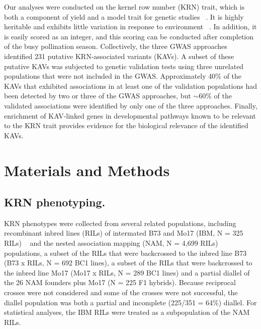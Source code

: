 \documentclass[10pt,letterpaper]{article}
\begin{document}
Our analyses were conducted on the kernel row number (KRN) trait, which is both a component of yield and a model trait for genetic studies ~\cite{hallauer2010quantitative}. It is highly heritable and exhibits little variation in response to environment ~\cite{Lu2011}. In addition, it is easily scored as an integer, and this scoring can be conducted after completion of the busy pollination season. Collectively, the three GWAS approaches identified 231 putative KRN-associated variants (KAVs). A subset of these putative KAVs was subjected to genetic validation tests using three unrelated populations that were not included in the GWAS. Approximately 40\% of the KAVs that exhibited associations in at least one of the validation populations had been detected by two or three of the GWAS approaches, but $\sim$60\% of the validated associations were identified by only one of the three approaches. Finally, enrichment of KAV-linked genes in developmental pathways known to be relevant to the KRN trait provides evidence for the biological relevance of the identified KAVs. 



\section*{Materials and Methods}
\subsection*{KRN phenotyping.}

KRN phenotypes were collected from several related populations, including recombinant inbred lines (RILs) of intermated B73 and Mo17 (IBM, N = 325 RILs) ~\cite{Lee2002} and the nested association mapping (NAM, N = 4,699 RILs) ~\cite{Yu2008} populations, a subset of the RILs that were backcrossed to the inbred line B73 (B73 x RILs, N = 692 BC1 lines), a subset of the RILs that were backcrossed to the inbred line Mo17 (Mo17 x RILs, N = 289 BC1 lines) and a partial diallel of the 26 NAM founders plus Mo17 (N = 225 F1 hybrids). Because reciprocal crosses were not considered and some of the crosses were not successful, the diallel population was both a partial and incomplete (225/351 = 64\%) diallel. For statistical analyses, the IBM RILs were treated as a subpopulation of the NAM RILs.
\end{document}
